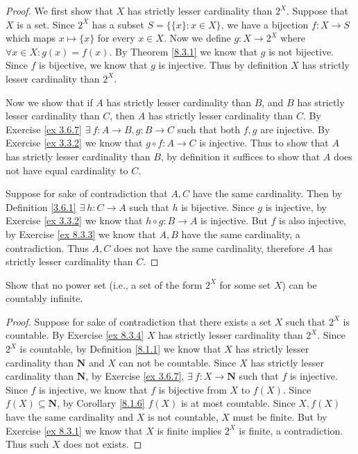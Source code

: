 \begin{proof}
    We first show that \(X\) has strictly lesser cardinality than \(2^X\).
    Suppose that \(X\) is a set.
    Since \(2^X\) has a subset \(S = \{\{x\} : x \in X\}\), we have a bijection \(f : X \to S\) which maps \(x \mapsto \{x\}\) for every \(x \in X\).
    Now we define \(g : X \to 2^X\) where \(\forall x \in X : g(x) = f(x)\).
    By Theorem \ref{8.3.1} we know that \(g\) is not bijective.
    Since \(f\) is bijective, we know that \(g\) is injective.
    Thus by definition \(X\) has strictly lesser cardinality than \(2^X\).

    Now we show that if \(A\) has strictly lesser cardinality than \(B\), and \(B\) has strictly lesser cardinality than \(C\), then \(A\) has strictly lesser cardinality than \(C\).
    By Exercise \ref{ex 3.6.7} \(\exists\ f : A \to B, g : B \to C\) such that both \(f, g\) are injective.
    By Exercise \ref{ex 3.3.2} we know that \(g \circ f : A \to C\) is injective.
    Thus to show that \(A\) has strictly lesser cardinality than \(B\), by definition it suffices to show that \(A\) does not have equal cardinality to \(C\).

    Suppose for sake of contradiction that \(A, C\) have the same cardinality.
    Then by Definition \ref{3.6.1} \(\exists\ h : C \to A\) such that \(h\) is bijective.
    Since \(g\) is injective, by Exercise \ref{ex 3.3.2} we know that \(h \circ g : B \to A\) is injective.
    But \(f\) is also injective, by Exercise \ref{ex 8.3.3} we know that \(A, B\) have the same cardinality, a contradiction.
    Thus \(A, C\) does not have the same cardinality, therefore \(A\) has strictly lesser cardinality than \(C\).
\end{proof}

\begin{exercise}\label{ex 8.3.5}
    Show that no power set (i.e., a set of the form \(2^X\) for some set \(X\)) can be countably infinite.
\end{exercise}

\begin{proof}
    Suppose for sake of contradiction that there exists a set \(X\) such that \(2^X\) is countable.
    By Exercise \ref{ex 8.3.4} \(X\) has strictly lesser cardinality than \(2^X\).
    Since \(2^X\) is countable, by Definition \ref{8.1.1} we know that \(X\) has strictly lesser cardinality than \(\mathbf{N}\) and \(X\) can not be countable.
    Since \(X\) has strictly lesser cardinality than \(\mathbf{N}\), by Exercise \ref{ex 3.6.7}, \(\exists\ f : X \to \mathbf{N}\) such that \(f\) is injective.
    Since \(f\) is injective, we know that \(f\) is bijective from \(X\) to \(f(X)\).
    Since \(f(X) \subseteq \mathbf{N}\), by Corollary \ref{8.1.6} \(f(X)\) is at most countable.
    Since \(X, f(X)\) have the same cardinality and \(X\) is not countable, \(X\) must be finite.
    But by Exercise \ref{ex 8.3.1} we know that \(X\) is finite implies \(2^X\) is finite, a contradiction.
    Thus such \(X\) does not exists.
\end{proof}